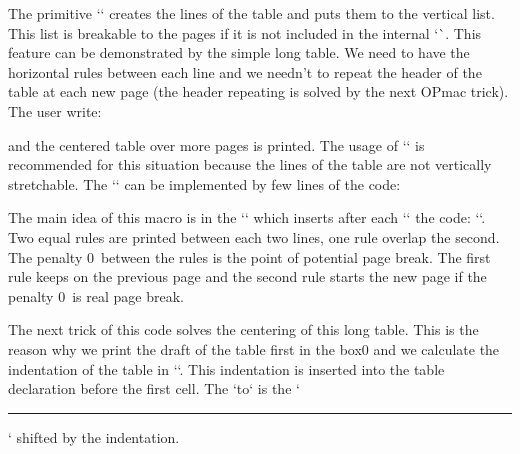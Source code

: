  


The primitive `\halign` creates the lines of the table and puts them to the vertical list. This list is breakable to the pages if it is not included in the internal `\vbox`. This feature can be demonstrated by the simple long table. We need to have the horizontal rules between each line and we needn't to repeat the header of the table at each new page (the header repeating is solved by the next OPmac trick). The user write: 

\begtt
{} 
\endtt


and the centered table over more pages is printed. The usage of `\raggedbottom` is recommended for this situation because the lines of the table are not vertically stretchable. The `\longtable` can be implemented by few lines of the code: 

\begtt
\def\longtable{\goodbreak \bgroup \catcode`\|=12 \tableL} 
\def\tableL#1#2{\setbox0=\table{#1}{#2}\setbox0=\hbox to\wd0{} %
   \tmpdim=\hsize \advance\tmpdim by-\wd0 \divide\tmpdim by2   %
   \def\tabstrut{\vrule height1.1em depth.5em width0pt }       %
   \everycr={\longtablecr}\offinterlineskip                    %
   \def\tmpa{}\tabdata={\kern\tmpdim}\scantabdata#1\relax      %
   \halign\expandafter{\the\tabdata\tabstrutA\cr#2\crcr}\egroup\goodbreak} 
\def\longtablecr{\noalign{\nobreak\ltrule\penalty0\kern-.4pt\ltrule\nobreak}} 
\def\ltrule{\moveright\tmpdim\hbox to\wd0{\hrulefill}} 
\endtt


The main idea of this macro is in the `\everycr` which inserts after each `\cr` the code: ``. Two equal rules are printed between each two lines, one rule overlap the second. The penalty 0~between the rules is the point of potential page break. The first rule keeps on the previous page and the second rule starts the new page if the penalty 0~is real page break. 



The next trick of this code solves the centering of this long table. This is the reason why we print the draft of the table first in the box0 and we calculate the indentation of the table in `\tmpdim`. This indentation is inserted into the table declaration before the first cell. The `\ltrule` is the `\hrule` shifted by the indentation. 


